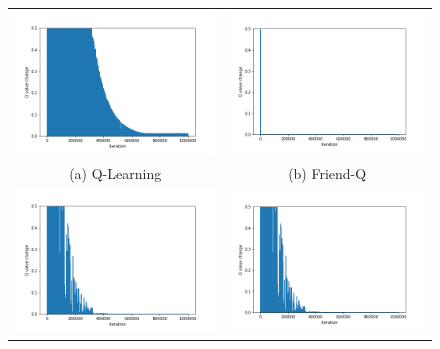 \documentclass[conference]{IEEEtran}
\begin{document}
\begin{figure}[h!]
	\begin{tabular}{cc}
		\includegraphics[width=3.4in]{figures/Q.png} &
		\includegraphics[width=3.4in]{figures/friendQ.png} \\
		(a) Q-Learning & (b) Friend-Q \\
		\includegraphics[width=3.4in]{figures/foeQ.png} &
		\includegraphics[width=3.4in]{figures/ceQ.png} \\

\end{tabular}
\end{figure}
\end{document}
